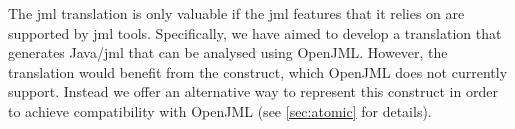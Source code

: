 The \ac{jml} translation is only valuable if the \ac{jml} features
that it relies on are supported by \ac{jml} tools. Specifically, we
have aimed to develop a translation that generates Java/\ac{jml} that
can be analysed using OpenJML. However, the translation would benefit
from the \invariantfor construct, which OpenJML does not currently
support. Instead we offer an alternative way to represent this
construct in order to achieve compatibility with OpenJML (see
\autoref{sec:atomic} for details).


